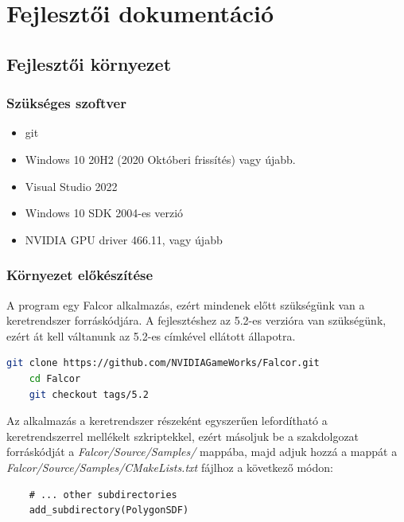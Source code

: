 \chapter{Fejlesztői dokumentáció}
\label{ch:impl}

\section{Fejlesztői környezet}

\subsection{Szükséges szoftver}

\begin{itemize}
	\item git
	\item Windows 10 20H2 (2020 Októberi frissítés) vagy újabb.
	\item Visual Studio 2022
	\item Windows 10 SDK 2004-es verzió
	\item NVIDIA GPU driver 466.11, vagy újabb
\end{itemize}

\subsection{Környezet előkészítése}

A program egy Falcor alkalmazás, ezért mindenek előtt szükségünk van a keretrendszer forráskódjára. A fejlesztéshez az 5.2-es verzióra van szükségünk, ezért át kell váltanunk az 5.2-es címkével ellátott állapotra.

\begin{lstlisting}[language=bash]
	git clone https://github.com/NVIDIAGameWorks/Falcor.git
	cd Falcor
	git checkout tags/5.2
\end{lstlisting}

Az alkalmazás a keretrendszer részeként egyszerűen lefordítható a keretrendszerrel mellékelt szkriptekkel, ezért másoljuk be a szakdolgozat forráskódját a \textit{Falcor/Source/Samples/} mappába, majd adjuk hozzá a mappát a \textit{Falcor/Source/Samples/CMakeLists.txt} fájlhoz a következő módon:
\begin{lstlisting}
	# ... other subdirectories
	add_subdirectory(PolygonSDF)
\end{lstlisting}

